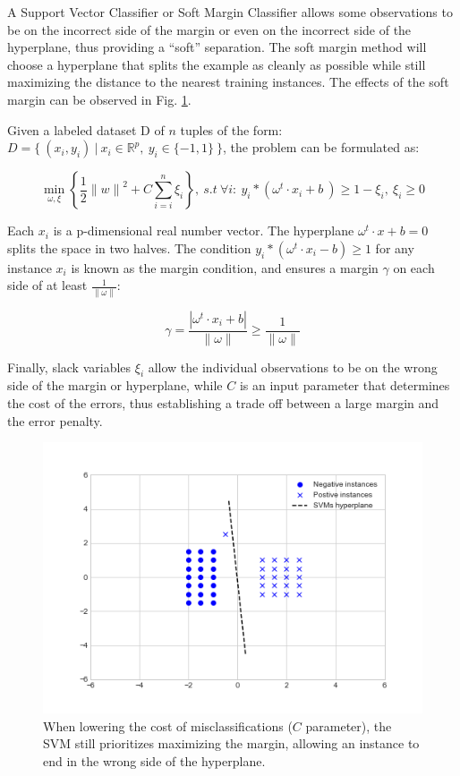 A Support Vector Classifier or Soft Margin Classifier allows some observations to be on the
incorrect side of the margin or even on the incorrect side of the hyperplane, thus providing
a ``soft'' separation. The soft margin method will choose a hyperplane that splits the example
as cleanly as possible while still maximizing the distance to the nearest training instances.
The effects of the soft margin can be observed in Fig. \ref{fig:soft_margin_low_c}.

Given a labeled dataset D of $n$ tuples
of the form: $D=\{ \ (x_{i}, y_{i}) \ | \ x_{i} \in \mathbb{R}^{p}, \ y_{i} \in \{-1, 1\} \ \}$, the
problem can be formulated as:

\begin{equation}
  \displaystyle \min_{\omega, \xi} \left\{ \frac{1}{2}{\| w \|}^{2} + C \sum_{i=i}^{n}\xi_{i} \right\}, \ s.t \ \forall i: \
  y_{i}*(\omega^{t} \cdot x_{i} + b \ ) \geq 1 - \xi_{i}, \ \xi_{i} \geq 0
  \label{eq:svm}
\end{equation}

Each $x_{i}$ is a p-dimensional real number vector.
The hyperplane $\omega^{t} \cdot x + b = 0$ splits the space in two halves.
The condition $y_{i}*(\omega^{t} \cdot x_{i} - b) \geq 1$ for any instance $x_{i}$ is
known as the margin condition,
and ensures a margin $\gamma$ on each side of at least
$\frac{1}{\| \omega \|}$:

\begin{equation}
  \gamma = \frac{ |\omega^{t} \cdot x_{i} + b| }{ \| \omega \| } \geq \frac{1}{\| \omega \|}
\end{equation}

Finally, slack variables $\xi_{i}$ allow the individual observations to be
on the wrong side of the
margin or hyperplane, while $C$ is an input parameter that determines the cost of
the errors, thus establishing a trade off between a large margin and the error penalty.

\begin{figure}[H]
  \centering
  \includegraphics[width=.55\linewidth]{files/figures/method/soft_margin_low_c}
  \caption{When lowering the cost of misclassifications ($C$ parameter), the SVM still
  prioritizes maximizing the margin, allowing an instance to end in the wrong side
  of the hyperplane.}
  \label{fig:soft_margin_low_c}
\end{figure}

